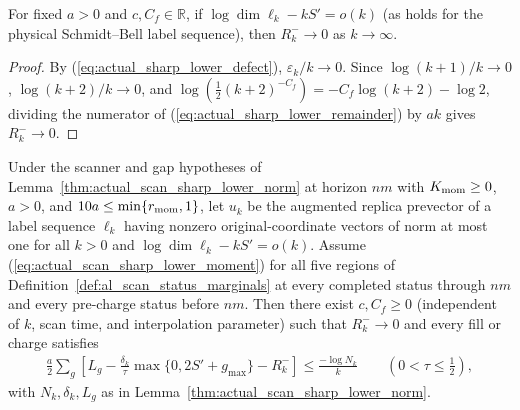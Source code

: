 \begin{lemma}
    \label{thm:actual_sharp_lower_remainder_limit}
    \leanok
    For fixed $a>0$ and $c,C_f\in\mathbb R$, if $\log\dim\ell_k-kS'=o(k)$
    (as holds for the physical Schmidt--Bell label sequence), then
    $R_k^-\to0$ as $k\to\infty$.
\end{lemma}

\begin{proof}
    \leanok
    By (\ref{eq:actual_sharp_lower_defect}), $\varepsilon_k/k\to0$. Since
    $\log(k+1)/k\to0$, $\log(k+2)/k\to0$, and
    $\log(\tfrac12(k+2)^{-C_f})=-C_f\log(k+2)-\log2$, dividing the
    numerator of (\ref{eq:actual_sharp_lower_remainder}) by $ak$ gives
    $R_k^-\to0$.
\end{proof}

\begin{lemma}
    \label{thm:actual_scan_supplied_prevector_sharp_lower}
    \leanok
    Under the scanner and gap hypotheses of
    Lemma~\ref{thm:actual_scan_sharp_lower_norm} at horizon $nm$ with
    $K_{\rm mom}\geq0$, $a>0$, and $10a\leq\min\{r_{\rm mom},1\}$, let
    $u_k$ be the augmented replica prevector of a label sequence $\ell_k$
    having nonzero original-coordinate vectors of norm at most one for all
    $k>0$ and $\log\dim\ell_k-kS'=o(k)$. Assume
    (\ref{eq:actual_scan_sharp_lower_moment}) for all five regions of
    Definition~\ref{def:al_scan_status_marginals} at every completed
    status through $nm$ and every pre-charge status before $nm$. Then there
    exist $c,C_f\geq0$ (independent of $k$, scan time, and interpolation
    parameter) such that $R_k^-\to0$ and every fill or charge satisfies
    \begin{align}
        \frac a2\sum_g\left[
            L_g-\frac{\delta_k}{\tau}\max\{0,2S'+g_{\max}\}-R_k^-
            \right]
        \leq\frac{-\log N_k}{k}
        \qquad(0<\tau\leq\tfrac12),
        \label{eq:actual_scan_supplied_prevector_rate}
    \end{align}
    with $N_k,\delta_k,L_g$ as in
    Lemma~\ref{thm:actual_scan_sharp_lower_norm}.
\end{lemma}

